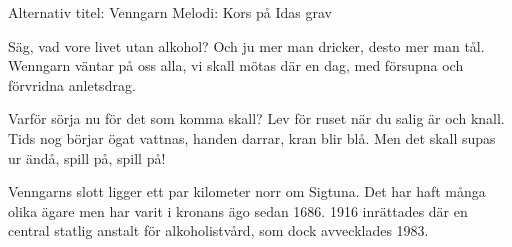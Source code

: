 \begin{song}

\begin{songmeta}
Alternativ titel: Venngarn
Melodi: Kors på Idas grav
\end{songmeta}

\begin{songtext}
Säg, vad vore livet utan alkohol?
Och ju mer man dricker, desto mer man tål.
Wenngarn väntar på oss alla,
vi skall mötas där en dag,
med försupna och förvridna anletsdrag.

Varför sörja nu för det som komma skall?
Lev för ruset när du salig är och knall.
Tids nog börjar ögat vattnas,
handen darrar, kran blir blå.
Men det skall supas ur ändå, spill på, spill på!
\end{songtext}

\begin{songnotes}
Venngarns slott ligger ett par kilometer norr om Sigtuna. Det har haft många olika ägare men har varit i kronans ägo sedan 1686. 1916 inrättades där en central statlig anstalt för alkoholistvård, som dock avvecklades 1983.
\end{songnotes}

\end{song}

